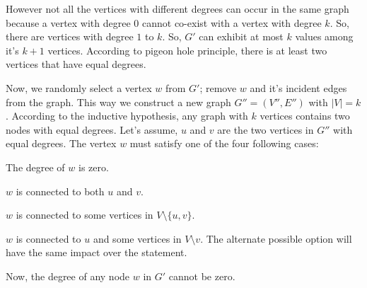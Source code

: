 \documentclass[11pt, oneside]{article}   	%
\begin{document}
However not all the vertices with different degrees can occur in the same graph because a vertex with degree $0$ cannot co-exist with a vertex with degree $k$. So, there are vertices with degree $1$ to $k$. So, $G'$ can exhibit at most $k$ values among it's $k+1$ vertices. According to pigeon hole principle, there is at least two vertices that have equal degrees.\\
\iffalse
\par Now, we randomly select a vertex $w$ from $G'$; remove $w$ and it's incident edges from the graph. This way we construct a new graph $G'' = (V'', E'')$ with $|V| = k$. According to the inductive hypothesis, any graph with $k$ vertices contains two nodes with equal degrees. Let's assume, $u$ and $v$ are the two vertices in $G''$ with equal degrees. The vertex $w$ must satisfy one of the four following cases:
 
\hspace{10 pt}
\begin{description}
\item [Case 0: ] The degree of $w$ is zero. 
\item [Case 1: ] $w$ is connected to both $u$ and $v$.
\item [Case 2: ] $w$ is connected to some vertices in $V \setminus \{u,v\}$.
\item [Case 3: ] $w$ is connected to $u$ and some vertices in $ V \setminus v$. The alternate possible option will have the same impact over the statement. 
\end{description}
\hspace{10 pt}
Now, the degree of any node $w$ in $G'$ cannot be zero.

\end{document}
